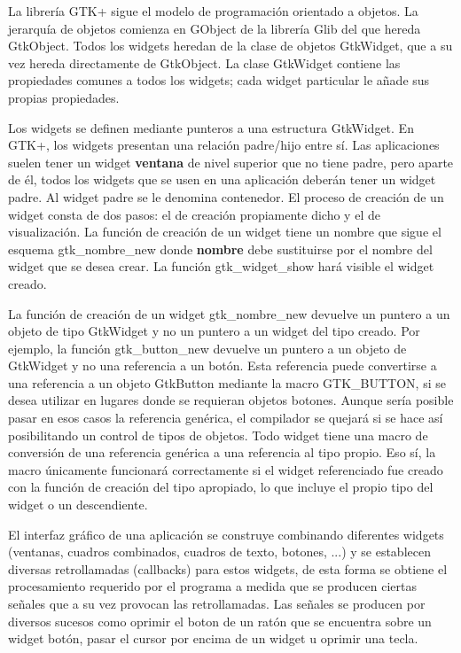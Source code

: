 \documentclass[12pt,twoside]{book}
\begin{document}
La librería GTK+ sigue el modelo de programación orientado a objetos. La jerarquía de objetos comienza en GObject de la librería Glib del que hereda GtkObject. Todos los widgets heredan de la clase de objetos GtkWidget, que a su vez hereda directamente de GtkObject. La clase GtkWidget contiene las propiedades comunes a todos los widgets; cada widget particular le añade sus propias propiedades.

Los widgets se definen mediante punteros a una estructura GtkWidget. En GTK+, los widgets presentan una relación padre/hijo entre sí. 
Las aplicaciones suelen tener un widget \textbf{ventana} de nivel superior que no tiene padre, pero aparte de él, todos los widgets que se usen en una aplicación deberán tener un widget padre. Al widget padre se le denomina contenedor. El proceso de creación de un widget consta de dos pasos: el de creación propiamente dicho y el de visualización. La función de creación de un widget tiene un nombre que sigue el esquema gtk\_nombre\_new donde \textbf{nombre} debe sustituirse por el nombre del widget que se desea crear. La función gtk\_widget\_show hará visible el widget creado.

La función de creación de un widget gtk\_nombre\_new devuelve un puntero a un objeto de tipo GtkWidget y no un puntero a un widget del tipo creado. Por ejemplo, la función gtk\_button\_new devuelve un puntero a un objeto de GtkWidget y no una referencia a un botón. Esta referencia puede convertirse a una referencia a un objeto GtkButton mediante la macro GTK\_BUTTON, si se desea utilizar en lugares donde se requieran objetos botones. Aunque sería posible pasar en esos casos la referencia genérica, el compilador se quejará si se hace así posibilitando un control de tipos de objetos. Todo widget tiene una macro de conversión de una referencia genérica a una referencia al tipo propio. Eso sí, la macro únicamente funcionará correctamente si el widget referenciado fue creado con la función de creación del tipo apropiado, lo que incluye el propio tipo del widget o un descendiente.

El interfaz gráfico de una aplicación se construye combinando diferentes widgets (ventanas, cuadros combinados, cuadros de texto, botones, ...) y se establecen diversas retrollamadas (callbacks) para estos widgets, de esta forma se obtiene el procesamiento requerido por el programa a medida que se producen ciertas señales que a su vez provocan las retrollamadas. Las señales se producen por diversos sucesos como oprimir el boton de un ratón que se encuentra sobre un widget botón, pasar el cursor por encima de un widget u oprimir una tecla.
\end{document}
